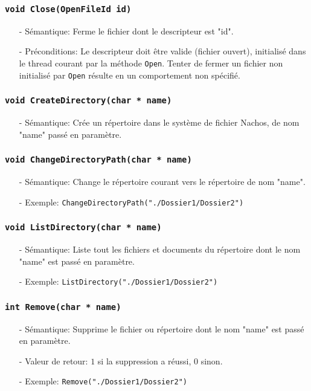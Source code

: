 \documentclass[11pt]{article}
\theoremstyle{definition}
\theoremstyle{definition}
\begin{document}
\subsubsection{\texttt{void Close(OpenFileId id)}}
\begin{itemize}
\item[-]Sémantique: Ferme le fichier dont le descripteur est "id".
\item[-]Préconditions: Le descripteur doit être valide (fichier ouvert), initialisé dans le thread courant
  par la méthode \texttt{Open}. Tenter de fermer un fichier non initialisé par \texttt{Open} résulte en un comportement non spécifié.
\end{itemize}

\subsubsection{\texttt{void CreateDirectory(char * name)}}
\begin{itemize}
\item[-]Sémantique: Crée un répertoire dans le système de fichier Nachos, de nom "name"
  passé en paramètre.
\end{itemize}

\subsubsection{\texttt{void ChangeDirectoryPath(char * name)}}
\begin{itemize}
\item[-]Sémantique: Change le répertoire courant vers le répertoire de nom "name".
\item[-]Exemple: \texttt{ChangeDirectoryPath("./Dossier1/Dossier2")}
\end{itemize}

\subsubsection{\texttt{void ListDirectory(char * name)}}
\begin{itemize}
\item[-]Sémantique: Liste tout les fichiers et documents du répertoire dont le nom "name"
  est passé en paramètre.
\item[-]Exemple: \texttt{ListDirectory("./Dossier1/Dossier2")}
\end{itemize}

 \subsubsection{\texttt{int Remove(char * name)}}
\begin{itemize}
\item[-]Sémantique: Supprime le fichier ou répertoire dont le nom "name" est passé en paramètre.
\item[-]Valeur de retour: $1$ si la suppression a réussi, $0$ sinon.
\item[-]Exemple: \texttt{Remove("./Dossier1/Dossier2")}
\end{itemize}
\end{document}
